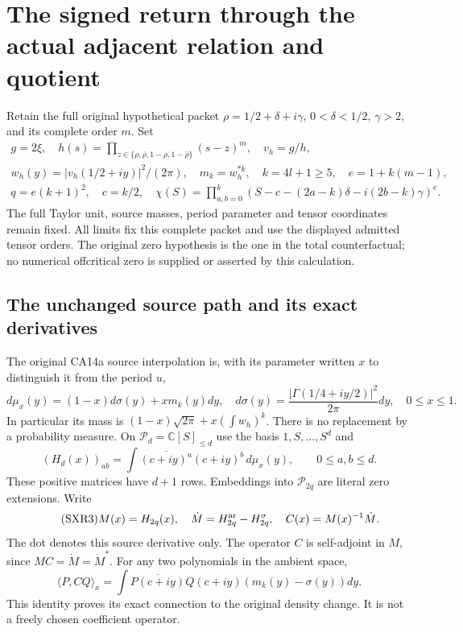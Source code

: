 \begingroup
\section{The signed return through the actual adjacent relation and quotient}
\label{sec:sxr}

Retain the full original hypothetical packet
$\rho=1/2+\delta+i\gamma$, $0<\delta<1/2$, $\gamma>2$, and its
complete order $m$. Set
\begin{equation}\tag{SXR1}
\begin{gathered}
 g=2\xi,\quad h(s)=\prod_{z\in\{\rho,\bar\rho,1-\rho,1-\bar\rho\}}
                    (s-z)^m,\quad v_h=g/h,\\
 w_h(y)=|v_h(1/2+iy)|^2/(2\pi),\quad m_k=w_h^{*k},\quad
 k=4l+1\ge5,\quad e=1+k(m-1),\\
 q=e(k+1)^2,\quad c=k/2,\quad
 \chi(S)=\prod_{a,b=0}^k
  (S-c-(2a-k)\delta-i(2b-k)\gamma)^e.
\end{gathered}
\end{equation}
The full Taylor unit, source masses, period parameter and tensor
coordinates remain fixed. All limits fix this complete packet and
use the displayed admitted tensor orders. The original zero hypothesis
is the one in the total counterfactual; no numerical offcritical zero
is supplied or asserted by this calculation.

\subsection{The unchanged source path and its exact derivatives}

The original CA14a source interpolation is, with its parameter written
$x$ to distinguish it from the period $u$,
\begin{equation}\tag{SXR2}
 d\mu_x(y)=(1-x)d\sigma(y)+x m_k(y)dy,\quad
 d\sigma(y)=\frac{|\Gamma(1/4+iy/2)|^2}{2\pi}dy,
 \quad 0\le x\le1.
\end{equation}
In particular its mass is
$(1-x)\sqrt{2\pi}+x(\int w_h)^k$. There is no replacement by
a probability measure. On $\mathcal P_d=\mathbb C[S]_{\le d}$
use the basis $1,S,\ldots,S^d$ and
\[
 (H_d(x))_{ab}=\int\overline{(c+iy)^a}(c+iy)^b\,d\mu_x(y),
 \qquad 0\le a,b\le d.
\]
These positive matrices have $d+1$ rows. Embeddings into
$\mathcal P_{2q}$ are literal zero extensions. Write
\begin{equation}\tag{SXR3}
 M(x)=H_{2q}(x),\quad \dot M=H_{2q}^{\rm ar}-H_{2q}^{\sigma},
 \quad C(x)=M(x)^{-1}\dot M.
\end{equation}
The dot denotes this source derivative only. The operator $C$ is
self-adjoint in $M$, since $MC=\dot M=\dot M^*$. For any two
polynomials in the ambient space,
\[
 \langle P,CQ\rangle_x
   =\int\overline{P(c+iy)}Q(c+iy)
                     (m_k(y)-\sigma(y))dy.
\]
This identity proves its exact connection to the original density
change. It is not a freely chosen coefficient operator.


